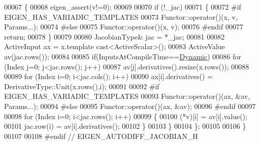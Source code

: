 \begin{DoxyCode}
00067   \{
00068     eigen\_assert(v!=0);
00069 
00070     \textcolor{keywordflow}{if} (!\_jac)
00071     \{
00072 \textcolor{preprocessor}{#if EIGEN\_HAS\_VARIADIC\_TEMPLATES}
00073       Functor::operator()(x, v, Params...);
00074 \textcolor{preprocessor}{#else}
00075       Functor::operator()(x, v);
00076 \textcolor{preprocessor}{#endif}
00077       \textcolor{keywordflow}{return};
00078     \}
00079 
00080     JacobianType& jac = *\_jac;
00081 
00082     ActiveInput ax = x.template cast<ActiveScalar>();
00083     ActiveValue av(jac.rows());
00084 
00085     \textcolor{keywordflow}{if}(InputsAtCompileTime==\hyperlink{namespace_eigen_ad81fa7195215a0ce30017dfac309f0b2}{Dynamic})
00086       \textcolor{keywordflow}{for} (Index j=0; j<jac.rows(); j++)
00087         av[j].derivatives().resize(x.rows());
00088 
00089     \textcolor{keywordflow}{for} (Index i=0; i<jac.cols(); i++)
00090       ax[i].derivatives() = DerivativeType::Unit(x.rows(),i);
00091 
00092 \textcolor{preprocessor}{#if EIGEN\_HAS\_VARIADIC\_TEMPLATES}
00093     Functor::operator()(ax, &av, Params...);
00094 \textcolor{preprocessor}{#else}
00095     Functor::operator()(ax, &av);
00096 \textcolor{preprocessor}{#endif}
00097 
00098     \textcolor{keywordflow}{for} (Index i=0; i<jac.rows(); i++)
00099     \{
00100       (*v)[i] = av[i].value();
00101       jac.row(i) = av[i].derivatives();
00102     \}
00103   \}
00104 \};
00105 
00106 \}
00107 
00108 \textcolor{preprocessor}{#endif // EIGEN\_AUTODIFF\_JACOBIAN\_H}
\end{DoxyCode}
